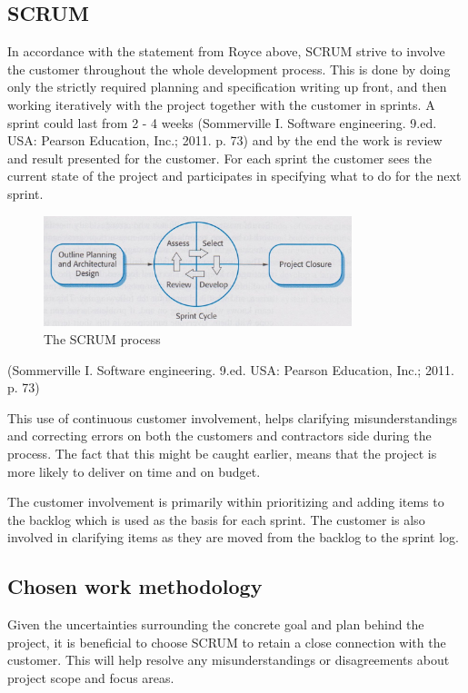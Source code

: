 \documentclass[11pt]{book}
\begin{document}

\subsection{SCRUM}
In accordance with the statement from Royce above, SCRUM strive to involve the customer throughout the whole development process. This is done by doing only the strictly required planning and specification writing up front, and then working iteratively with the project together with the customer in sprints. A sprint could last from 2 - 4 weeks (Sommerville I. Software engineering. 9.ed. USA: Pearson Education, Inc.; 2011. p. 73) and by the end the work is review and result presented for the customer. For each sprint the customer sees the current state of the project and participates in specifying what to do for the next sprint.

\begin{figure}[H]
      \centering
      \includegraphics[width=0.8\textwidth]{Figures/Prestudy/SCRUM.jpeg}
      \caption{The SCRUM process}
      \label{fig:pre_scrum}
\end{figure}

(Sommerville I. Software engineering. 9.ed. USA: Pearson Education, Inc.; 2011. p. 73)

This use of continuous customer involvement, helps clarifying misunderstandings and correcting errors on both the customers and contractors side during the process. The fact that this might be caught earlier, means that the project is more likely to deliver on time and on budget.

The customer involvement is primarily within prioritizing and adding items to the backlog which is used as the basis for each sprint. The customer is also involved in clarifying items as they are moved from the backlog to the sprint log.


\subsection{Chosen work methodology}
Given the uncertainties surrounding the concrete goal and plan behind the project, it is beneficial to choose SCRUM to retain a close connection with the customer. This will help resolve any misunderstandings or disagreements about project scope and focus areas.
\end{document}
